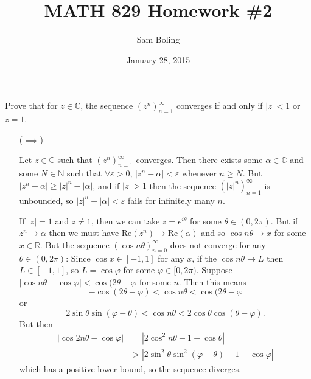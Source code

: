 \documentclass{article}
\title{MATH 829 Homework \#2}
\date{January 28, 2015}
\author{Sam Boling}
\newcounter{Problem}
\newenvironment{Problem}{\begin{Exercise}[name={Problem},
                                          counter={Problem}]}
                        {\end{Exercise}}
\begin{document}
\begin{titlepage}
\maketitle
\end{titlepage}

\begin{Problem}
  Prove that for $z \in \mathbb{C}$, the sequence $(z^n)_{n=1}^\infty$
  converges if and only if $|z| < 1$ or $z = 1$.
\end{Problem}

\begin{Answer}
  \begin{itemize}
    \item[($\implies$)]{
      Let $z \in \mathbb{C}$ such that $(z^n)_{n=1}^\infty$ converges.
      Then there exists some $\alpha \in \mathbb{C}$ and some
      $N \in \mathbb{N}$ such that $\forall \varepsilon > 0$,
      $|z^n - \alpha| < \varepsilon$ whenever $n \geq N$.
      But $|z^n - \alpha| \geq |z|^n - |\alpha|$, and if
      $|z| > 1$ then the sequence $(|z|^n)_{n=1}^\infty$ is unbounded,
      so $|z|^n - |\alpha| < \varepsilon$ fails
      for infinitely many $n$.

      If $|z| = 1$ and $z \neq 1$, then we can take $z = e^{i\theta}$
      for some $\theta \in (0, 2 \pi)$. But if
      $z^n \to \alpha$ then we must have
      $\mathrm{Re}(z^n) \to \mathrm{Re}(\alpha)$ and so
      $\cos n\theta \to x$ for some $x \in \mathbb{R}$.
      But the sequence $(\cos n \theta)_{n=0}^\infty$ does
      not converge for any $\theta \in (0, 2 \pi)$:
      Since $\cos x \in [-1, 1]$ for any $x$, if
      the $\cos n\theta \to L$ then $L \in [-1, 1]$,
      so $L = \cos \varphi$ for some
      $\varphi \in [0, 2 \pi)$.
      Suppose
      $|\cos n\theta - \cos \varphi| < \cos(2 \theta -
      \varphi$ for some $n$. Then this means
      $$
      -\cos(2 \theta - \varphi) < \cos n\theta < \cos(2 \theta - \varphi
      $$
      or
      $$
      2 \sin \theta \sin(\varphi - \theta) < \cos n \theta < 2 \cos
      \theta \cos (\theta - \varphi).
      $$
      But then
      \begin{align*}
         |\cos 2 n \theta - \cos \varphi|
      &= |2 \cos^2 n \theta - 1 - \cos \theta| \\
      &> |2 \sin^2 \theta \sin^2(\varphi - \theta) - 1 - \cos \varphi|
      \end{align*}
      which has a positive lower bound, so the sequence diverges.

}
\end{itemize}
\end{Answer}
\end{document}
